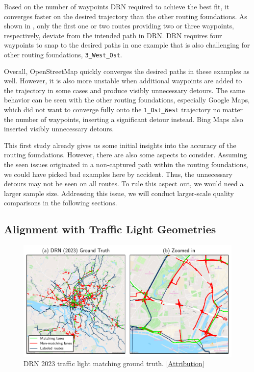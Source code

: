 Based on the number of waypoints DRN required to achieve the best fit, it converges faster on the desired trajectory than the other routing foundations. As shown in , only the first one or two routes providing two or three waypoints, respectively, deviate from the intended path in DRN. DRN requires four waypoints to snap to the desired paths in one example that is also challenging for other routing foundations, \texttt{3\_West\_Ost}.

Overall, OpenStreetMap quickly converges the desired paths in these examples as well. However, it is also more unstable when additional waypoints are added to the trajectory in some cases and produce visibly unnecessary detours. The same behavior can be seen with the other routing foundations, especially Google Maps, which did not want to converge fully onto the \texttt{1\_Ost\_West} trajectory no matter the number of waypoints, inserting a significant detour instead. Bing Maps also inserted visibly unnecessary detours. 

This first study already gives us some initial insights into the accuracy of the routing foundations. However, there are also some aspects to consider. Assuming the seen issues originated in a non-captured path within the routing foundations, we could have picked bad examples here by accident. Thus, the unnecessary detours may not be seen on all routes. To rule this aspect out, we would need a larger sample size. Addressing this issue, we will conduct larger-scale quality comparisons in the following sections.

\subsection{Alignment with Traffic Light Geometries} \label{sec:lorenz4}

\begin{figure}[t]
\centering 
\includegraphics[width=\linewidth]{images/matching-ground-truth-drn.pdf}
\caption{DRN 2023 traffic light matching ground truth. [\hyperref[attribution]{Attribution}]}
\label{fig:matching-ground-truth-drn}
\end{figure}

